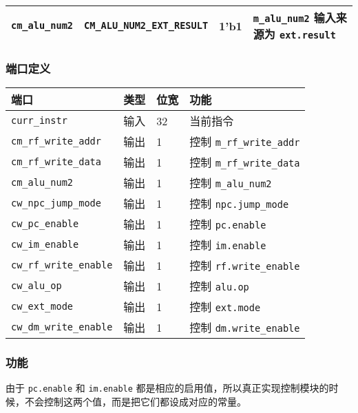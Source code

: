 \begin{longtable}[]{@{}llll@{}}
\begin{minipage}[t]{0.22\columnwidth}
\texttt{cm\_alu\_num2}\strut
\end{minipage} & \begin{minipage}[t]{0.22\columnwidth}\raggedright
\texttt{CM\_ALU\_NUM2\_EXT\_RESULT}\strut
\end{minipage} & \begin{minipage}[t]{0.22\columnwidth}\raggedright
1'b1\strut
\end{minipage} & \begin{minipage}[t]{0.22\columnwidth}\raggedright
\texttt{m\_alu\_num2} 输入来源为 \texttt{ext.result}\strut
\end{minipage}\tabularnewline
\bottomrule
\end{longtable}

\hypertarget{ux7aefux53e3ux5b9aux4e49-6}{%
\subsubsection{端口定义}\label{ux7aefux53e3ux5b9aux4e49-6}}

\begin{longtable}[]{@{}llll@{}}
\toprule
端口 & 类型 & 位宽 & 功能\tabularnewline
\midrule
\endhead
\texttt{curr\_instr} & 输入 & 32 & 当前指令\tabularnewline
\texttt{cm\_rf\_write\_addr} & 输出 & 1 & 控制
\texttt{m\_rf\_write\_addr}\tabularnewline
\texttt{cm\_rf\_write\_data} & 输出 & 1 & 控制
\texttt{m\_rf\_write\_data}\tabularnewline
\texttt{cm\_alu\_num2} & 输出 & 1 & 控制
\texttt{m\_alu\_num2}\tabularnewline
\texttt{cw\_npc\_jump\_mode} & 输出 & 1 & 控制
\texttt{npc.jump\_mode}\tabularnewline
\texttt{cw\_pc\_enable} & 输出 & 1 & 控制
\texttt{pc.enable}\tabularnewline
\texttt{cw\_im\_enable} & 输出 & 1 & 控制
\texttt{im.enable}\tabularnewline
\texttt{cw\_rf\_write\_enable} & 输出 & 1 & 控制
\texttt{rf.write\_enable}\tabularnewline
\texttt{cw\_alu\_op} & 输出 & 1 & 控制 \texttt{alu.op}\tabularnewline
\texttt{cw\_ext\_mode} & 输出 & 1 & 控制
\texttt{ext.mode}\tabularnewline
\texttt{cw\_dm\_write\_enable} & 输出 & 1 & 控制
\texttt{dm.write\_enable}\tabularnewline
\bottomrule
\end{longtable}

\hypertarget{ux529fux80fd-13}{%
\subsubsection{功能}\label{ux529fux80fd-13}}

由于 \texttt{pc.enable} 和 \texttt{im.enable}
都是相应的启用值，所以真正实现控制模块的时候，不会控制这两个值，而是把它们都设成对应的常量。

